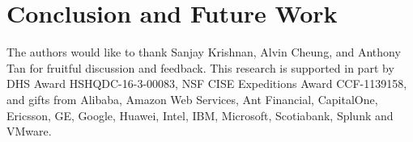 

\section{Conclusion and Future Work}

\begin{acks}
  The authors would like to thank Sanjay Krishnan, Alvin Cheung, and Anthony
  Tan for fruitful discussion and feedback.
  This research is supported in part by DHS Award HSHQDC-16-3-00083, NSF CISE
  Expeditions Award CCF-1139158, and gifts from Alibaba, Amazon Web Services, Ant
  Financial, CapitalOne, Ericsson, GE, Google, Huawei, Intel, IBM, Microsoft,
  Scotiabank, Splunk and VMware.
\end{acks}
